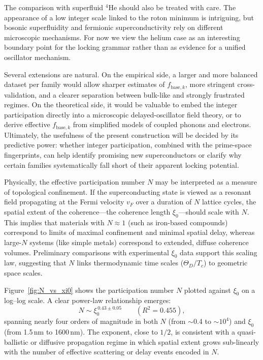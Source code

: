 \documentclass[aps,prb,twocolumn,superscriptaddress,floatfix,nofootinbib]{revtex4-2}
\begin{document}
The comparison with superfluid \(^4\)He should also be treated with care.
The appearance of a low integer scale linked to the roton minimum is
intriguing, but bosonic superfluidity and fermionic superconductivity rely
on different microscopic mechanisms. For now we view the helium case as an
interesting boundary point for the locking grammar rather than as evidence
for a unified oscillator mechanism.

Several extensions are natural. On the empirical side, a larger and more
balanced dataset per family would allow sharper estimates of
\(f_{\mathrm{base},k}\), more stringent cross-validation, and a clearer
separation between bulk-like and strongly frustrated regimes. On the
theoretical side, it would be valuable to embed the integer participation
directly into a microscopic delayed-oscillator field theory, or to derive
effective \(f_{\mathrm{base},k}\) from simplified models of coupled phonons
and electrons. Ultimately, the usefulness of the present construction will
be decided by its predictive power: whether integer participation, combined
with the prime-space fingerprints, can help identify promising new
superconductors or clarify why certain families systematically fall short of
their apparent locking potential.

Physically, the effective participation number $N$ may be interpreted as a 
measure of topological confinement. If the superconducting state is viewed 
as a resonant field propagating at the Fermi velocity $v_F$ over a duration 
of $N$ lattice cycles, the spatial extent of the coherence---the coherence 
length $\xi_0$---should scale with $N$. This implies that materials 
with $N \approx 1$ (such as iron-based compounds) correspond to limits of 
maximal confinement and minimal spatial delay, whereas large-$N$ systems 
(like simple metals) correspond to extended, diffuse coherence volumes. 
Preliminary comparisons with experimental $\xi_0$ data support this scaling 
law, suggesting that $N$ links thermodynamic time scales ($\Theta_D / T_c$) 
to geometric space scales.

Figure~\ref{fig:N_vs_xi0} shows the participation number $N$ plotted against 
$\xi_0$ on a log--log scale. A clear power-law relationship emerges:
%
\begin{equation}
N \sim \xi_0^{\,0.43 \pm 0.05} \qquad (R^2 = 0.455),
\label{eq:N_xi0_scaling}
\end{equation}
%
spanning nearly four orders of magnitude in both $N$ (from $\sim$0.4 to 
$\sim 10^4$) and $\xi_0$ (from 1.5\,nm to 1600\,nm). The exponent, close 
to $1/2$, is consistent with a quasi-ballistic or diffusive propagation 
regime in which spatial extent grows sub-linearly with the number of effective 
scattering or delay events encoded in $N$.
\end{document}
